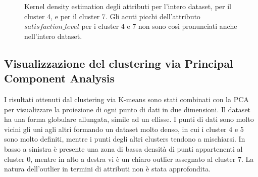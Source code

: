\documentclass[10pt,a4paper,twocolumn]{report}
\begin{document}
\begin{figure}%
    \centering
    \caption{Kernel density estimation degli attributi 
    		\protect{} per l'intero dataset, 
    		\protect{} per il cluster 4, e
    		\protect{} per il cluster 7. Gli acuti picchi dell'attributo $satisfaction\_level$ per i cluster 4 e 7 non sono così pronunciati anche nell'intero dataset.}%
    \label{fig:kde_clusters}%
\end{figure}

\subsection{Visualizzazione del clustering via Principal Component Analysis}
I risultati ottenuti dal clustering via K-means sono stati combinati con la PCA per visualizzare la proiezione di ogni punto di dati in due dimensioni. Il dataset ha una forma globulare allungata, simile ad un ellisse. I punti di dati sono molto vicini gli uni agli altri formando un dataset molto denso, in cui i cluster 4 e 5 sono molto definiti, mentre i punti degli altri clusters tendono a mischiarsi. In basso a sinistra è presente una zona di bassa densità di punti appartenenti al cluster 0, mentre in alto a destra vi è un chiaro outlier assegnato al cluster 7. La natura dell'outlier in termini di attributi non è stata approfondita.
\end{document}
